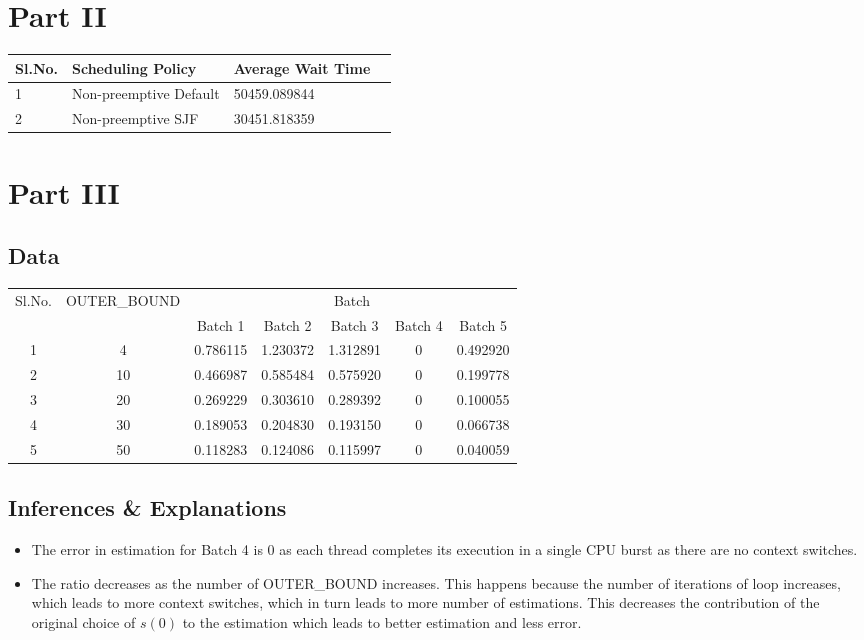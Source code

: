 \documentclass{article}
\begin{document}
\section{Part II}
\begin{center}
    \begin{tabular}{| l | l | l | l |}
    \hline
    Sl.No. & Scheduling Policy & Average Wait Time \\ \hline
    1 & Non-preemptive Default & 50459.089844 \\
    2 & Non-preemptive SJF & 30451.818359 \\
    \hline
    \end{tabular}
\end{center}
\section{Part III}
\subsection{Data}
\begin{center}
    \begin{tabular}{| c | c | c | c | c | c | c |}
    \hline
    \multirow{2}{*}{Sl.No.} & \multirow{2}{*}{OUTER\_BOUND} & \multicolumn{5}{|c|}{Batch}\\ \cline{3-7}
    
     &  & Batch 1 & Batch 2 & Batch 3 & Batch 4 & Batch 5\\ \hline
     1 & 4 & 0.786115 & 1.230372 & 1.312891 & 0 & 0.492920 \\
     2 & 10 & 0.466987 & 0.585484 & 0.575920 & 0 & 0.199778\\
     3 & 20 & 0.269229 & 0.303610 & 0.289392 & 0 & 0.100055\\
     4 & 30 & 0.189053 & 0.204830 & 0.193150 & 0 & 0.066738\\
     5 & 50 & 0.118283 & 0.124086 & 0.115997 & 0 & 0.040059\\
    \hline
    \end{tabular}
\end{center}
\subsection{Inferences \& Explanations}
\begin{itemize}
  \item The error in estimation for Batch 4 is $0$ as each thread completes its execution in a single CPU burst as there are no context switches.
  \item The ratio decreases as the number of OUTER\_BOUND increases. This happens because the number of iterations of loop increases, which leads to more context switches, which in turn leads to more number of estimations. This decreases the contribution of the original choice of $s(0)$ to the estimation which leads to better estimation and less error.
\end{itemize}
\end{document}
